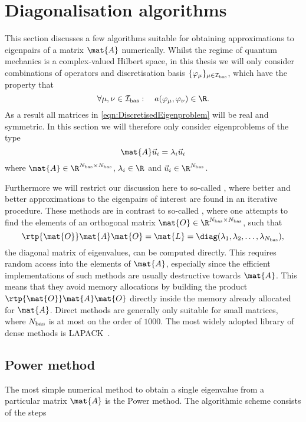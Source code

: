\section{Diagonalisation algorithms}
\label{sec:DiagAlgos}

This section discusses a few algorithms suitable for obtaining
approximations to eigenpairs of a matrix $\mat{A}$ numerically.
Whilst the regime of quantum mechanics is a complex-valued Hilbert space,
in this thesis
we will only consider combinations of operators and discretisation basis
$\{\varphi_\mu\}_{\mu \in \mathcal{I}_\text{bas}}$,
which have the property that
\[ \forall \mu, \nu \in \Ibas: \quad a(\varphi_\mu, \varphi_\nu) \in \R. \]
As a result all matrices in \eqref{eqn:DiscretisedEigenproblem} will be real and symmetric.
In this section we will therefore only consider eigenproblems of the type
\[ \mat{A} \vec{u}_i = \lambda_i \vec{u}_i \]
where $\mat{A} \in \R^{\Nbas \times \Nbas}$,
$\lambda_i \in \R$ and $\vec{u}_i \in \R^{\Nbas}$.

Furthermore we will restrict our discussion here to so-called
,
where better and better approximations to the eigenpairs of interest
are found in an iterative procedure.
These methods are in contrast to so-called ,
where one attempts to find the elements of an orthogonal matrix $\mat{O} \in \R^{\Nbas\times\Nbas}$,
such that
\[ \rtp{\mat{O}} \mat{A} \mat{O} = \mat{L} = \diag(\lambda_1, \lambda_2, \ldots, \lambda_{\Nbas}), \]
the diagonal matrix of eigenvalues, can be computed directly.
This requires random access into the elements of $\mat{A}$,
especially since the efficient implementations of such methods
are usually destructive towards $\mat{A}$.
This means that they avoid memory allocations by building the product
$\rtp{\mat{O}} \mat{A} \mat{O}$ directly inside the memory already allocated for $\mat{A}$.
Direct methods are generally only suitable for small matrices,
where $N_\text{bas}$ is at most on the order of $1000$.
The most widely adopted library of dense methods is LAPACK~\cite{LAPACK}.

\subsection{Power method}
The most simple numerical method to obtain
a single eigenvalue from a particular matrix $\mat{A}$
is the Power method.
The algorithmic scheme consists of the steps



